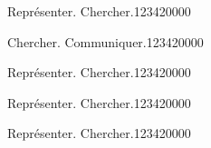 
\begin{pageCours}

\end{pageCours}

\begin{pageAD}


\begin{ExoCad}{Représenter. Chercher.}{1234}{2}{0}{0}{0}{0}
 
\end{ExoCad}
 

\begin{ExoCad}{Chercher. Communiquer.}{1234}{2}{0}{0}{0}{0}
  
\end{ExoCad}
 


\end{pageAD}

\begin{pageParcoursu}

\begin{ExoCu}{Représenter. Chercher.}{1234}{2}{0}{0}{0}{0}
 
\end{ExoCu}

\begin{ExoCu}{Représenter. Chercher.}{1234}{2}{0}{0}{0}{0}
 
\end{ExoCu}

\begin{ExoCu}{Représenter. Chercher.}{1234}{2}{0}{0}{0}{0}
 
\end{ExoCu}


\end{pageParcoursu}


